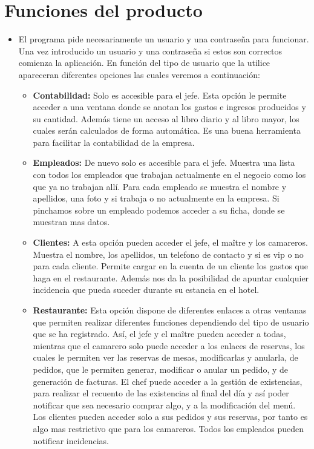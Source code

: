 \documentclass[spanish,a4paper,11pt, twoside]{report}	%
\begin{document}
\section{Funciones del producto}
	\begin{itemize}
		\item El programa pide necesariamente un usuario y una contraseña para funcionar. Una vez introducido un usuario y una contraseña si estos son correctos comienza la aplicación. En función del tipo de usuario que la utilice apareceran diferentes opciones las cuales veremos a continuación:
		\begin{itemize}
			\item \textbf{Contabilidad:} Solo es accesible para el jefe. Esta opción le permite acceder a una ventana donde se anotan los gastos e ingresos producidos y su cantidad. Además tiene un acceso al libro diario y al libro mayor, los cuales serán calculados de forma automática. Es una buena herramienta para facilitar la contabilidad de la empresa.
			\item \textbf{Empleados:} De nuevo solo es accesible para el jefe. Muestra una lista con todos los empleados que trabajan actualmente en el negocio como los que ya no trabajan allí. Para cada empleado se muestra el nombre y apellidos, una foto y si trabaja o no actualmente en la empresa. Si pinchamos sobre un empleado podemos acceder a su ficha, donde se muestran mas datos.
			\item \textbf{Clientes:} A esta opción pueden acceder el jefe, el maître y los camareros. Muestra el nombre, los apellidos, un telefono de contacto y si es vip o no para cada cliente. Permite cargar en la cuenta de un cliente los gastos que haga en el restaurante. Además nos da la posibilidad de apuntar cualquier incidencia que pueda suceder durante su estancia en el hotel.
			\item \textbf{Restaurante:} Esta opción dispone de diferentes enlaces a otras ventanas que permiten realizar diferentes funciones dependiendo del tipo de usuario que se ha registrado. Así, el jefe y el maître pueden acceder a todas, mientras que el camarero solo puede acceder a los enlaces de reservas, los cuales le permiten ver las reservas de mesas, modificarlas y anularla, de pedidos, que le permiten generar, modificar o anular un pedido, y de generación de facturas. El chef puede acceder a la gestión de existencias, para realizar el recuento de las existencias al final del día y así poder notificar que sea necesario comprar algo, y a la modificación del menú. Los clientes pueden acceder solo a sus pedidos y sus reservas, por tanto es algo mas restrictivo que para los camareros. Todos los empleados pueden notificar incidencias.

\end{itemize}
\end{itemize}
\end{document}
